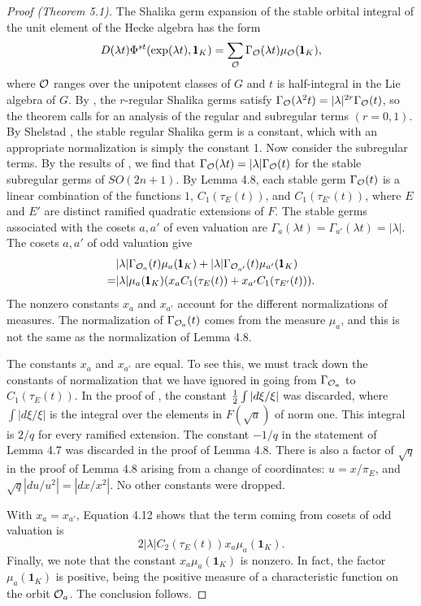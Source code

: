 \documentclass{amsart}
\begin{document}
\begin{proof}[Proof (Theorem 5.1)]  The Shalika germ expansion of the stable
orbital integral of the
unit element of the Hecke algebra has the form
$$D(\lambda t)\Phi^{st}(\exp(\lambda t),{\pmb 1}_K) =
       \sum_{{\mathcal O}} \Gamma_{{\mathcal O}} (\lambda t)\mu_{{\mathcal O}}({\pmb 1}_K),$$
where ${\mathcal O}$ ranges over the unipotent classes of $G$ and $t$ is half-integral
in the Lie algebra of $G$.  
By \cite{HC}, the $r$-regular Shalika germs satisfy
$\Gamma_{\mathcal O}(\lambda^2 t) = |\lambda|^{2r} \Gamma_{\mathcal O}(t)$,
so the theorem calls for an analysis of the regular and
subregular terms $(r=0,1)$.
  By Shelstad \cite{Sh}, the
stable regular Shalika germ is a constant, which with an appropriate
normalization is simply the constant 1.  Now consider the subregular
terms.  By the results of \cite{H3,VI.2}, we find that
$\Gamma_{\mathcal O}(\lambda t) = |\lambda | \Gamma_{\mathcal O}(t)$ for the
stable subregular germs of $SO(2n+1)$.
By Lemma 4.8, each stable germ $\Gamma_{\mathcal O}(t)$ is a linear combination
of the functions $1$, $C_1(\tau_E(t))$, and $C_1(\tau_{E'}(t))$,
where $E$ and $E'$ are distinct ramified quadratic extensions of $F$.
The stable germs associated with the cosets 
$a,a'$ of even valuation are $\Gamma_a(\lambda t) = \Gamma_{a'}
(\lambda t) = |\lambda|$.
The cosets $a,a'$ of odd valuation give
\begin{align*}
&|\lambda| \Gamma_{{\mathcal O}_a}(t)\mu_a({\pmb 1}_K) 
   + |\lambda|\Gamma_{{\mathcal O}_{a'}}(t)
\mu_{a'}({\pmb 1}_K)\\
=&|\lambda|\mu_a({\pmb 1}_K) (x_a C_1(\tau_E(t)) + x_{a'} C_1(\tau_{E'}(t))).
\end{align*}
The nonzero 
constants $x_a$ and $x_{a'}$ account for the different normalizations of
measures.  The normalization of $\Gamma_{{\mathcal O}_a}(t)$ 
comes from the measure
$\mu_a$, and this is not the same as the normalization of Lemma 4.8.

The constants $x_a$ and $x_{a'}$ are equal.  To see this, we
must track down the constants of normalization that we have ignored
in going from $\Gamma_{{\mathcal O}_a}$ to $C_1(\tau_E(t))$.  In the proof
of \cite{H5,1.2}, the constant ${1\over 2}\int |d\xi/\xi|$ was
discarded, where $\int |d\xi/\xi|$ is the integral over the
elements in $F(\sqrt{a})$ of norm one.  This integral is $2/q$
for every ramified extension. The constant $-1/q$ in the
statement of Lemma 4.7 was discarded in the proof of Lemma 4.8.
There is also a factor of $\sqrt{q}$ in the proof of Lemma 4.8 
arising from a
change of coordinates: $u=x/\pi_E$, and $\sqrt{q}|du/u^2|=|dx/x^2|$.
No other constants were dropped.

  With $x_a=x_{a'}$, Equation 4.12 shows that
the term
coming from cosets of odd valuation is
$$2|\lambda| C_2(\tau_E(t)) x_a \mu_a({\pmb 1_K}).$$
Finally, we note that the constant $x_a\mu_a({\pmb 1}_K)$ is nonzero.
In fact, the factor $\mu_a({\pmb 1}_K)$ is positive, being the
positive measure of a characteristic function on the orbit ${\mathcal O}_a$.
 The conclusion follows.  \end{proof}
\end{document}
